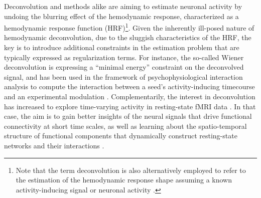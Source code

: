 Deconvolution and methods alike are aiming to estimate neuronal activity by
undoing the blurring effect of the hemodynamic response, characterized as a
hemodynamic response function (HRF)\footnote{Note that the term deconvolution is
also alternatively employed to refer to the estimation of the hemodynamic
response shape assuming a known activity-inducing signal or neuronal activity
\citep{Goutte2000Modelinghaemodynamicresponse,Marrelec2002Bayesianestimationhemodynamic,
Ciuciu2003Unsupervisedrobustnonparametric,Casanova2008impacttemporalregularization}.
}. Given the inherently ill-posed nature of hemodynamic deconvolution, due to
the sluggish characteristics of the HRF, the key is to introduce
additional constraints in the estimation problem that are typically expressed as
regularization terms. For instance, the so-called Wiener deconvolution is
expressing a \enquote{minimal energy} constraint on the deconvolved signal, and
has been used in the framework of psychophysiological interaction analysis to
compute the interaction between a seed's activity-inducing timecourse and an
experimental modulation
\citep{Glover1999DeconvolutionImpulseResponse,Gitelman2003Modelingregionalpsychophysiologic,
Gerchen2014Analyzingtaskdependent,Di2018TaskConnectomicsExamining,
Freitas2020Timeresolvedeffective}. Complementarily, the interest in
deconvolution has increased to explore time-varying activity in resting-state
fMRI data
\citep{Preti2017dynamicfunctionalconnectome,Keilholz2017TimeResolvedResting,
Lurie2020Questionscontroversiesstudy,Bolton2020TappingMultiFaceted}. In that
case, the aim is to gain better insights of the neural signals that drive
functional connectivity at short time scales, as well as learning about the
spatio-temporal structure of functional components that dynamically construct
resting-state networks and their interactions
\citep{Karahanoglu2017Dynamicslargescale}.

